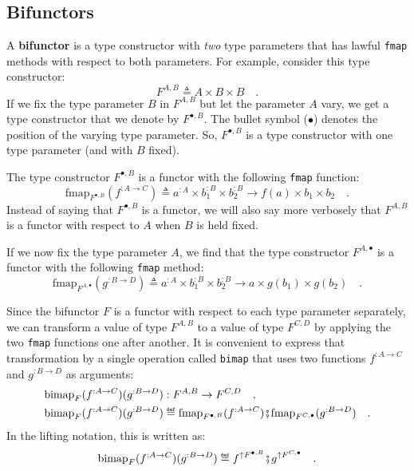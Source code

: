 \subsection{Bifunctors\label{subsec:Bifunctors}}

A \textbf{bifunctor} is a type constructor with
\emph{two} type parameters that has lawful \lstinline!fmap! methods
with respect to both parameters. For example, consider this type constructor:
\[
F^{A,B}\triangleq A\times B\times B\quad.
\]
If we fix the type parameter $B$ in $F^{A,B}$ but let the parameter
$A$ vary, we get a type constructor that we denote by $F^{\bullet,B}$.
The bullet symbol ($\bullet$) denotes the position of the varying
type parameter. So, $F^{\bullet,B}$ is a type constructor with one
type parameter (and with $B$ fixed).

The type constructor $F^{\bullet,B}$ is a functor with the following
\lstinline!fmap! function:
\[
\text{fmap}_{F^{\bullet,B}}(f^{:A\rightarrow C})\triangleq a^{:A}\times b_{1}^{:B}\times b_{2}^{:B}\rightarrow f(a)\times b_{1}\times b_{2}\quad.
\]
Instead of saying that $F^{\bullet,B}$ is a functor, we will also
say more verbosely that $F^{A,B}$ is a functor with respect to $A$
when $B$ is held fixed.

If we now fix the type parameter $A$, we find that the type constructor
$F^{A,\bullet}$ is a functor with the following \lstinline!fmap!
method:
\[
\text{fmap}_{F^{A,\bullet}}(g^{:B\rightarrow D})\triangleq a^{:A}\times b_{1}^{:B}\times b_{2}^{:B}\rightarrow a\times g(b_{1})\times g(b_{2})\quad.
\]

Since the bifunctor $F$ is a functor with respect to each type parameter
separately, we can transform a value of type $F^{A,B}$ to a value
of type $F^{C,D}$ by applying the two \lstinline!fmap! functions
one after another. It is convenient to express that transformation
by a single operation called \lstinline!bimap! that uses two functions
$f^{:A\rightarrow C}$ and $g^{:B\rightarrow D}$ as arguments:
\begin{align}
\text{bimap}_{F}(f^{:A\rightarrow C})(g^{:B\rightarrow D}) & :F^{A,B}\rightarrow F^{C,D}\quad,\nonumber \\
\text{bimap}_{F}(f^{:A\rightarrow C})(g^{:B\rightarrow D}) & \triangleq\text{fmap}_{F^{\bullet,B}}(f^{:A\rightarrow C})\bef\text{fmap}_{F^{C,\bullet}}(g^{:B\rightarrow D})\quad.\label{eq:f-definition-of-bimap}
\end{align}
In the lifting notation, this is written as:
\[
\text{bimap}_{F}(f^{:A\rightarrow C})(g^{:B\rightarrow D})\triangleq f^{\uparrow F^{\bullet,B}}\bef g^{\uparrow F^{C,\bullet}}\quad.
\]

